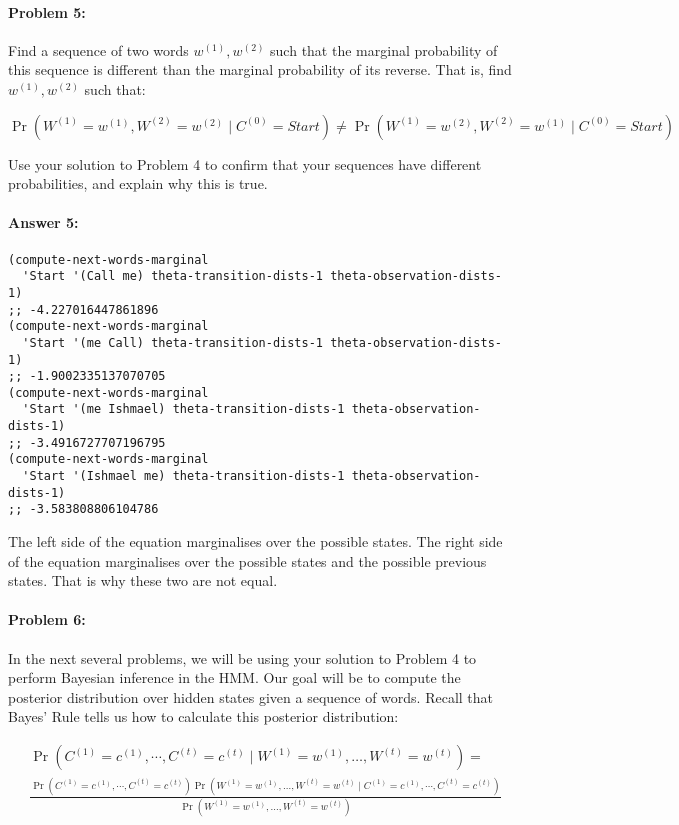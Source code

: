 \documentclass[12pt, letterpaper]{article}
\begin{document}
\hrulefill
\paragraph{Problem 5:}
Find a sequence of two words $w^{(1)},w^{(2)}$ such that the marginal
probability of this sequence is different than the marginal
probability of its reverse. That is, find $w^{(1)},w^{(2)}$ such that:

\begin{equation}
\nonumber
\Pr(W^{(1)}=w^{(1)}, W^{(2)} =w^{(2)} \mid C^{(0)}=Start ) \neq \Pr(W^{(1)}=w^{(2)}, W^{(2)} =w^{(1)} \mid C^{(0)}=Start )
\end{equation}

Use your solution to Problem 4 to confirm that your sequences have
different probabilities, and explain why this is true.

\paragraph{Answer 5:}\begin{lstlisting}
(compute-next-words-marginal 
  'Start '(Call me) theta-transition-dists-1 theta-observation-dists-1)
;; -4.227016447861896
(compute-next-words-marginal 
  'Start '(me Call) theta-transition-dists-1 theta-observation-dists-1)
;; -1.9002335137070705
(compute-next-words-marginal 
  'Start '(me Ishmael) theta-transition-dists-1 theta-observation-dists-1)
;; -3.4916727707196795
(compute-next-words-marginal 
  'Start '(Ishmael me) theta-transition-dists-1 theta-observation-dists-1)
;; -3.583808806104786
\end{lstlisting}

The left side of the equation marginalises over the possible states. The right side of the equation marginalises over the possible states and the possible previous states. That is why these two are not equal.

\hrulefill
\paragraph{Problem 6:}

In the next several problems, we will be using your solution to
Problem 4 to perform Bayesian inference in the HMM. Our goal will be
to compute the posterior distribution over hidden states given a
sequence of words. Recall that Bayes' Rule tells us how to calculate
this posterior distribution:

\begin{align*}
&\Pr(C^{(1)}=c^{(1)},\cdots,C^{(t)}=c^{(t)} \mid W^{(1)}=w^{(1)},\dots,W^{(t)}=w^{(t)} ) = \\ &\frac{\Pr(C^{(1)}=c^{(1)},\cdots,C^{(t)}=c^{(t)}) \Pr( W^{(1)}=w^{(1)},\dots,W^{(t)}=w^{(t)} \mid C^{(1)}=c^{(1)},\cdots,C^{(t)}=c^{(t)})}{\Pr(W^{(1)}=w^{(1)},\dots,W^{(t)}=w^{(t)} )}
\end{align*}
\end{document}
